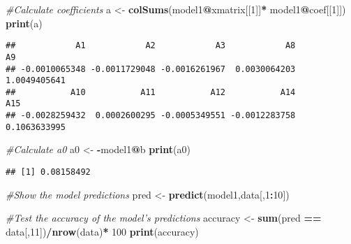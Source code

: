 \documentclass[
]{article}
\newenvironment{Shaded}{\begin{snugshade}}{\end{snugshade}}
\newcommand{\CommentTok}[1]{\textcolor[rgb]{0.56,0.35,0.01}{\textit{#1}}}
\newcommand{\DecValTok}[1]{\textcolor[rgb]{0.00,0.00,0.81}{#1}}
\newcommand{\FunctionTok}[1]{\textcolor[rgb]{0.13,0.29,0.53}{\textbf{#1}}}
\newcommand{\NormalTok}[1]{#1}
\newcommand{\OtherTok}[1]{\textcolor[rgb]{0.56,0.35,0.01}{#1}}
\newcommand{\SpecialCharTok}[1]{\textcolor[rgb]{0.81,0.36,0.00}{\textbf{#1}}}
\begin{document}
\begin{Shaded}
\begin{Highlighting}[]
\CommentTok{\#Calculate coefficients }
\NormalTok{a }\OtherTok{\textless{}{-}} \FunctionTok{colSums}\NormalTok{(model1}\SpecialCharTok{@}\NormalTok{xmatrix[[}\DecValTok{1}\NormalTok{]]}\SpecialCharTok{*}\NormalTok{ model1}\SpecialCharTok{@}\NormalTok{coef[[}\DecValTok{1}\NormalTok{]])}
\FunctionTok{print}\NormalTok{(a)}
\end{Highlighting}
\end{Shaded}

\begin{verbatim}
##            A1            A2            A3            A8            A9 
## -0.0010065348 -0.0011729048 -0.0016261967  0.0030064203  1.0049405641 
##           A10           A11           A12           A14           A15 
## -0.0028259432  0.0002600295 -0.0005349551 -0.0012283758  0.1063633995
\end{verbatim}

\begin{Shaded}
\begin{Highlighting}[]
\CommentTok{\#Calculate a0}
\NormalTok{a0 }\OtherTok{\textless{}{-}} \SpecialCharTok{{-}}\NormalTok{model1}\SpecialCharTok{@}\NormalTok{b}
\FunctionTok{print}\NormalTok{(a0)}
\end{Highlighting}
\end{Shaded}

\begin{verbatim}
## [1] 0.08158492
\end{verbatim}

\begin{Shaded}
\begin{Highlighting}[]
\CommentTok{\#Show the model predictions }
\NormalTok{pred }\OtherTok{\textless{}{-}} \FunctionTok{predict}\NormalTok{(model1,data[,}\DecValTok{1}\SpecialCharTok{:}\DecValTok{10}\NormalTok{])}
\end{Highlighting}
\end{Shaded}

\begin{Shaded}
\begin{Highlighting}[]
\CommentTok{\#Test the accuracy of the model’s predictions}
\NormalTok{accuracy }\OtherTok{\textless{}{-}} \FunctionTok{sum}\NormalTok{(pred }\SpecialCharTok{==}\NormalTok{ data[,}\DecValTok{11}\NormalTok{])}\SpecialCharTok{/}\FunctionTok{nrow}\NormalTok{(data)}\SpecialCharTok{*} \DecValTok{100}
\FunctionTok{print}\NormalTok{(accuracy)}
\end{Highlighting}
\end{Shaded}
\end{document}
